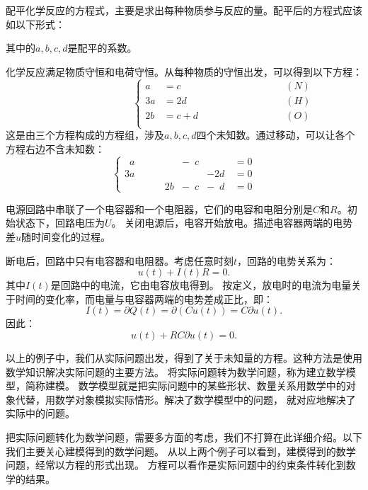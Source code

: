 \documentclass[12pt,UTF8]{ctexbook}
\begin{document}
配平化学反应的方程式，主要是求出每种物质参与反应的量。配平后的方程式应该如以下形式：

\begin{center}
\end{center}

其中的$a, b, c, d$是配平的系数。

化学反应满足物质守恒和电荷守恒。从每种物质的守恒出发，可以得到以下方程：
$$ \qquad \qquad \qquad \qquad \left\{
    \begin{array}{rll}
a &= c &\qquad \qquad \qquad \qquad (N) \\
3a &= 2d &\qquad \qquad \qquad \qquad (H) \\
2b &= c + d &\qquad \qquad \qquad \qquad (O) \\
\end{array}
\right. 
$$
这是由三个方程构成的方程组，涉及$a, b, c, d$四个未知数。通过移动，可以让各个方程右边不含未知数：
$$\left\{
    \begin{array}{rrrrl}
\phantom{0}a &\phantom{+ 0b} &- \phantom{0}c &\phantom{+ 0b}\, &= 0  \\
3a &\phantom{+ 0b} &\phantom{- 0c} &- 2d\, &= 0  \\
\phantom{0a} &\phantom{+ }\quad 2b &- \phantom{0}c &- \phantom{0}d\, &= 0  
\end{array}
\right. 
$$

\begin{ex}
    电源回路中串联了一个电容器和一个电阻器，它们的电容和电阻分别是$C$和$R$。初始状态下，回路电压为$U$。
    关闭电源后，电容开始放电。描述电容器两端的电势差$u$随时间变化的过程。
\end{ex}

断电后，回路中只有电容器和电阻器。考虑任意时刻$t$，回路的电势关系为：
$$ u(t) + I(t)R = 0.$$
其中$I(t)$是回路中的电流，它由电容放电得到。
按定义，放电时的电流为电量关于时间的变化率，而电量与电容器两端的电势差成正比，即：
$$ I(t) = \partial Q(t) = \partial (Cu(t)) = C\partial  u(t).$$
因此：
$$ u(t) + RC\partial  u(t) = 0.$$

以上的例子中，我们从实际问题出发，得到了关于未知量的方程。这种方法是使用数学知识解决实际问题的主要方法。
将实际问题转为数学问题，称为建立数学模型，简称建模。
数学模型就是把实际问题中的某些形状、数量关系用数学中的对象代替，用数学对象模拟实际情形。解决了数学模型中的问题，
就对应地解决了实际中的问题。

把实际问题转化为数学问题，需要多方面的考虑，我们不打算在此详细介绍。以下我们主要关心建模得到的数学问题。
从以上两个例子可以看到，建模得到的数学问题，经常以方程的形式出现。
方程可以看作是实际问题中的约束条件转化到数学的结果。
\end{document}
